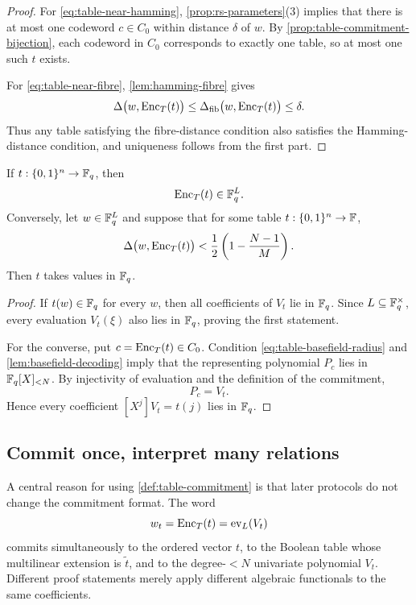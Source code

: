 \begin{proof}
For \eqref{eq:table-near-hamming}, \cref{prop:rs-parameters}(3) implies that there is at most one codeword $c\in C_0$ within distance $\delta$ of $w$.  By \cref{prop:table-commitment-bijection}, each codeword in $C_0$ corresponds to exactly one table, so at most one such $t$ exists.

For \eqref{eq:table-near-fibre}, \cref{lem:hamming-fibre} gives
\[
  \Delta\bigl(w,\operatorname{Enc}_T(t)\bigr)
  \le
  \Delta_{\mathrm{fib}}\bigl(w,\operatorname{Enc}_T(t)\bigr)
  \le\delta.
\]
Thus any table satisfying the fibre-distance condition also satisfies the Hamming-distance condition, and uniqueness follows from the first part.
\end{proof}

\begin{proposition}
\label{prop:table-basefield-consistency}
If $t:\{0,1\}^n\to\mathbb{F}_q$, then
\[
  \operatorname{Enc}_T(t)\in\mathbb{F}_q^L.
\]
Conversely, let $w\in\mathbb{F}_q^L$ and suppose that for some table $t:\{0,1\}^n\to\mathbb{F}$,
\begin{equation}
  \Delta\bigl(w,\operatorname{Enc}_T(t)\bigr)
  <\frac12\left(1-\frac{N-1}{M}\right).
  \label{eq:table-basefield-radius}
\end{equation}
Then $t$ takes values in $\mathbb{F}_q$.
\end{proposition}

\begin{proof}
If $t(w)\in\mathbb{F}_q$ for every $w$, then all coefficients of $V_t$ lie in $\mathbb{F}_q$.  Since $L\subseteq\mathbb{F}_q^\times$, every evaluation $V_t(\xi)$ also lies in $\mathbb{F}_q$, proving the first statement.

For the converse, put $c=\operatorname{Enc}_T(t)\in C_0$.  Condition \eqref{eq:table-basefield-radius} and \cref{lem:basefield-decoding} imply that the representing polynomial $P_c$ lies in $\mathbb{F}_q[X]_{<N}$.  By injectivity of evaluation and the definition of the commitment,
\[
  P_c=V_t.
\]
Hence every coefficient $[X^j]V_t=t(j)$ lies in $\mathbb{F}_q$.
\end{proof}

\subsection{Commit once, interpret many relations}
\label{sec:table-commitment-interpretation}

A central reason for using \cref{def:table-commitment} is that later protocols do not change the commitment format.  The word
\[
  w_t=\operatorname{Enc}_T(t)=\operatorname{ev}_L(V_t)
\]
commits simultaneously to the ordered vector $t$, to the Boolean table whose multilinear extension is $\widetilde t$, and to the degree-$<N$ univariate polynomial $V_t$.  Different proof statements merely apply different algebraic functionals to the same coefficients.

